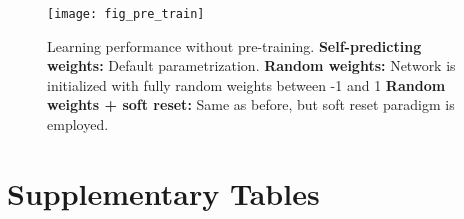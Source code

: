 \begin{figure}[h!]
  \centering
  \texttt{[image: fig\_pre\_train]}
  \caption[Learning performance without pre-training.]{Learning performance without pre-training.
    \textbf{Self-predicting weights:} Default parametrization. \textbf{Random weights:} Network is initialized with
    fully random weights between -1 and 1 \textbf{Random weights + soft reset:} Same as before, but soft reset paradigm
    is employed. }
  \label{fig-pre-train}
\end{figure}


\clearpage

\section{Supplementary Tables}



\renewcommand{\thetable}{S\arabic{table}}


